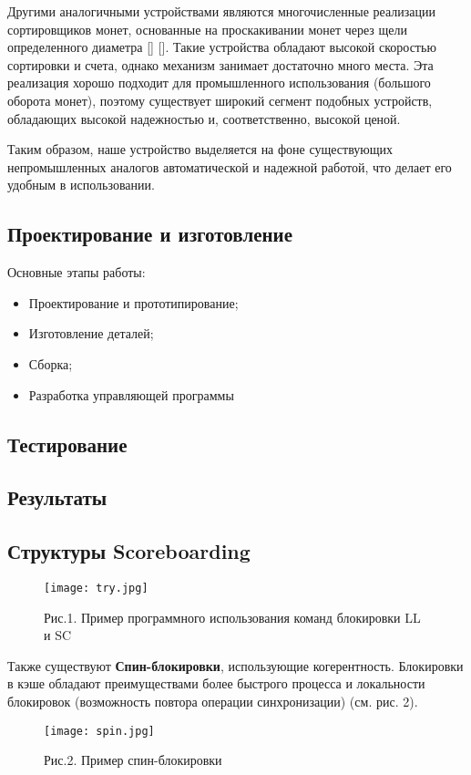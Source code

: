 Другими аналогичными устройствами являются многочисленные реализации сортировщиков монет, основанные на проскакивании монет через щели определенного диаметра [] []. Такие устройства обладают высокой скоростью сортировки и счета, однако механизм занимает достаточно много места. Эта реализация хорошо подходит для промышленного использования (большого оборота монет), поэтому существует широкий сегмент подобных устройств, обладающих высокой надежностью и, соответственно, высокой ценой. 

Таким образом, наше устройство выделяется на фоне существующих непромышленных аналогов автоматической и надежной работой, что делает его удобным в использовании.

\subsection {Проектирование и изготовление}

Основные этапы работы:

\begin{itemize}
	\item Проектирование и прототипирование; 
	\item Изготовление деталей;
	\item Сборка;
	\item Разработка управляющей программы
\end{itemize}






\subsection {Тестирование}

\subsection {Результаты}

\subsection {Структуры Scoreboarding}

\begin{figure}[H]
	\centering
	\texttt{[image: try.jpg]}
	\caption{Рис.1. Пример программного использования команд блокировки LL и SC}
	\label{fig:p_chest}
\end{figure}
\par\medskip

Также существуют \textbf{Спин-блокировки}, использующие когерентность. Блокировки в кэше обладают преимуществами более быстрого процесса и локальности блокировок (возможность повтора операции синхронизации) (см. рис. 2).

\begin{figure}[H]
	\centering
	\texttt{[image: spin.jpg]}
	\caption{Рис.2. Пример спин-блокировки}
	\label{fig:p_chest}
\end{figure}
\par\medskip